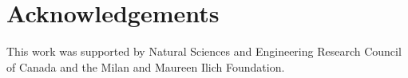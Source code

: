 \section*{Acknowledgements}
\label{sec:achnowledge}
This work was supported by Natural Sciences and Engineering Research Council of
Canada and the Milan and Maureen Ilich Foundation.
